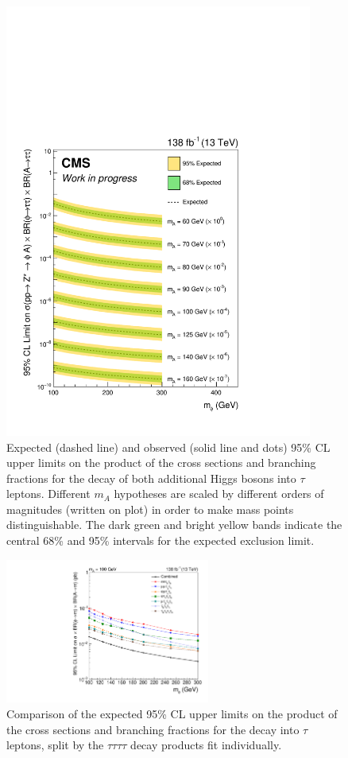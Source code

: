 \begin{figure}[!hbtp]
\centering
    \includegraphics[width=0.9\textwidth]{Figures/model_independent_limit_all.pdf}
\caption{Expected (dashed line) and observed (solid line and dots) 95\% CL upper limits on the product of the cross sections and branching fractions for the decay of both additional Higgs bosons into $\tau$ leptons. Different $m_{A}$ hypotheses are scaled by different orders of magnitudes (written on plot) in order to make mass points distinguishable. The dark green and bright yellow bands indicate the central 68\% and 95\% intervals for the expected exclusion limit.}
\label{fig:4tau_mi}
\end{figure}

\begin{figure}[!hbtp]
\centering
    \includegraphics[width=0.6\textwidth]{Figures/limit_comparison_4tau.pdf}
\caption{Comparison of the expected 95\% CL upper limits on the product of the cross sections and branching fractions for the decay into $\tau$ leptons, split by the $\tau\tau\tau\tau$ decay products fit individually.}
\label{fig:4tau_limit_comparison}
\end{figure}

